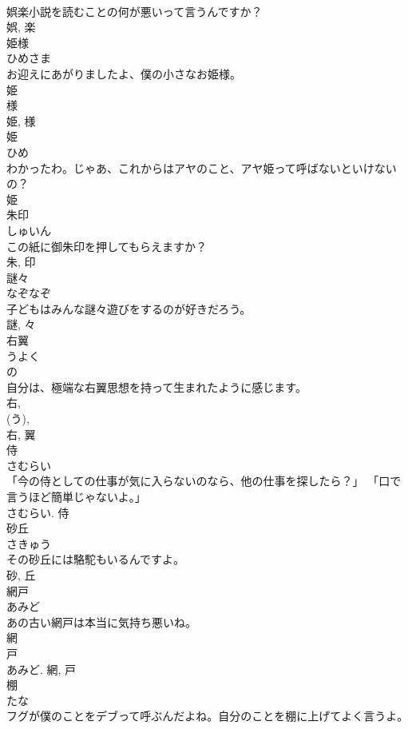 \documentclass[8pt]{extreport}
\begin{document}
\begin{CJK}{UTF8}{min}
\\	娯楽小説を読むことの何が悪いって言うんですか？	
\\	娯, 楽	
\\	姫様	
\\	ひめさま	
\\	お迎えにあがりましたよ、僕の小さなお姫様。	
\\	姫 
\\	様 
\\	姫, 様	
\\	姫	
\\	ひめ	
\\	わかったわ。じゃあ、これからはアヤのこと、アヤ姫って呼ばないといけないの？	
\\	姫	
\\	朱印	
\\	しゅいん	
\\	この紙に御朱印を押してもらえますか？	
\\	朱, 印	
\\	謎々	
\\	なぞなぞ	
\\	子どもはみんな謎々遊びをするのが好きだろう。	
\\	謎, 々	
\\	右翼	
\\	うよく	
\\	の 
\\	自分は、極端な右翼思想を持って生まれたように感じます。	
\\	右, 
\\	(う), 
\\	右, 翼	
\\	侍	
\\	さむらい	
\\	「今の侍としての仕事が気に入らないのなら、他の仕事を探したら？」 「口で言うほど簡単じゃないよ。」	
\\	さむらい.	侍	
\\	砂丘	
\\	さきゅう	
\\	その砂丘には駱駝もいるんですよ。	
\\	砂, 丘	
\\	網戸	
\\	あみど	
\\	あの古い網戸は本当に気持ち悪いね。	
\\	網 
\\	戸 
\\	あみど.	網, 戸	
\\	棚	
\\	たな	
\\	フグが僕のことをデブって呼ぶんだよね。自分のことを棚に上げてよく言うよ。	

\end{CJK}
\end{document}
